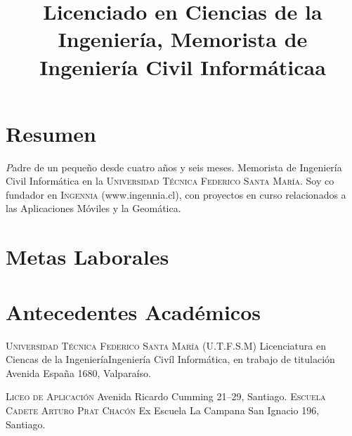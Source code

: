 \documentclass[11pt,letterpaper,roman]{moderncv}
\title{\normalfont \small  Licenciado en Ciencias de la Ingeniería,  Memorista
de Ingeniería Civil Informáticaa}
\begin{document}
 \maketitle

\section*{\textbf{Resumen}} \textsl Padre de un pequeño desde cuatro
años y seis meses. Memorista de Ingeniería Civil Informática en la
\textsc{Universidad Técnica Federico Santa María}. Soy co fundador en
\textsc{Ingennia} (www.ingennia.cl), con proyectos en curso relacionados a las
Aplicaciones Móviles y la Geomática.

\section{Metas Laborales} 

\section{Antecedentes Académicos}
 {\textsc{Universidad T\'ecnica Federico Santa
Mar\'ia (U.T.F.S.M)}} {Licenciatura en Ciencas de la Ingeniería}{Ingeniería
Civíl Informática, en trabajo de titulación} {} {Avenida España 1680,
Valparaíso.}
	

 {\textsc{Liceo de Aplicaci\'on}} {} {} {} {Avenida
Ricardo Cumming 21--29, Santiago.}
 {\textsc{Escuela Cadete Arturo Prat Chac\'on}} {Ex
Escuela La Campana} {} {} {San Ignacio 196, Santiago.}
\end{document}
